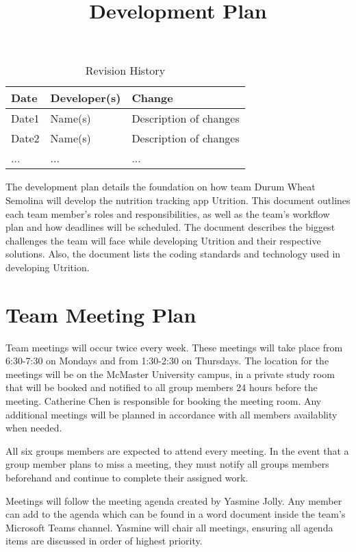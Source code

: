 \documentclass{article}
\title{Development Plan\\\progname}
\author{\authname}
\date{}
\begin{document}
\begin{table}[hp]
\caption{Revision History} \label{TblRevisionHistory}
\begin{tabularx}{\textwidth}{llX}
\toprule
\textbf{Date} & \textbf{Developer(s)} & \textbf{Change}\\
\midrule
Date1 & Name(s) & Description of changes\\
Date2 & Name(s) & Description of changes\\
... & ... & ...\\
\bottomrule
\end{tabularx}
\end{table}

\newpage

\maketitle

The development plan details the foundation on how team Durum Wheat Semolina will develop the nutrition tracking app Utrition. This document outlines each team member’s roles and responsibilities, as well as the team’s workflow plan and how deadlines will be scheduled. The document describes the biggest challenges the team will face while developing Utrition and their respective solutions. Also, the document lists the coding standards and technology used in developing Utrition.

\section{Team Meeting Plan}

Team meetings will occur twice every week. These meetings will take place from 6:30-7:30 on Mondays and from 1:30-2:30 on Thursdays. The location for the meetings will be on the McMaster University campus, in a private study room that will be booked and notified to all group members 24 hours before the meeting. Catherine Chen is responsible for booking the meeting room. Any additional meetings will be planned in accordance with all members availablity when needed.

All six groups members are expected to attend every meeting. In the event that a group member plans to miss a meeting, they must notify all groups members beforehand and continue to complete their assigned work.

Meetings will follow the meeting agenda created by Yasmine Jolly. Any member can add to the agenda which can be found in a word document inside the team's Microsoft Teams channel. Yasmine will chair all meetings, ensuring all agenda items are discussed in order of highest priority.
\end{document}
